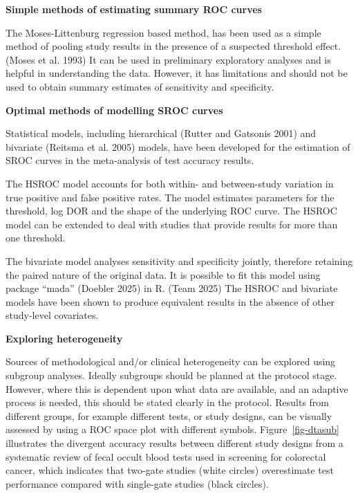 \documentclass[
  10pt,
  a4paper,
  DIV=11,
  numbers=noendperiod]{scrreprt}
\begin{document}
\textbf{Simple methods of estimating summary ROC curves}

The Moses-Littenburg regression based method, has been used as a simple
method of pooling study results in the presence of a suspected threshold
effect. (Moses et al. 1993) It can be used in preliminary exploratory
analyses and is helpful in understanding the data. However, it has
limitations and should not be used to obtain summary estimates of
sensitivity and specificity.

\textbf{Optimal methods of modelling SROC curves}

Statistical models, including hierarchical (Rutter and Gatsonis 2001)
and bivariate (Reitsma et al. 2005) models, have been developed for the
estimation of SROC curves in the meta-analysis of test accuracy results.

The HSROC model accounts for both within- and between-study variation in
true positive and false positive rates. The model estimates parameters
for the threshold, log DOR and the shape of the underlying ROC curve.
The HSROC model can be extended to deal with studies that provide
results for more than one threshold.

The bivariate model analyses sensitivity and specificity jointly,
therefore retaining the paired nature of the original data. It is
possible to fit this model using package ``mada'' (Doebler 2025) in R.
(Team 2025) The HSROC and bivariate models have been shown to produce
equivalent results in the absence of other study-level covariates.

\textbf{Exploring heterogeneity}

Sources of methodological and/or clinical heterogeneity can be explored
using subgroup analyses. Ideally subgroups should be planned at the
protocol stage. However, where this is dependent upon what data are
available, and an adaptive process is needed, this should be stated
clearly in the protocol. Results from different groups, for example
different tests, or study designs, can be visually assessed by using a
ROC space plot with different symbols. Figure~\ref{fig-dtasub}
illustrates the divergent accuracy results between different study
designs from a systematic review of fecal occult blood tests used in
screening for colorectal cancer, which indicates that two-gate studies
(white circles) overestimate test performance compared with single-gate
studies (black circles).
\end{document}

